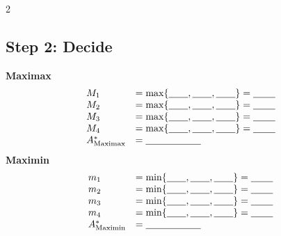\begin{multicols}{2}
		\subsection*{Step 2: Decide}
		\textbf{Maximax}
		\[
		\begin{array}{ll}
			M_1 &= \max\{\underline{\hspace{0.7cm}},\underline{\hspace{0.7cm}},\underline{\hspace{0.7cm}}\}
			=\underline{\hspace{0.8cm}} \\
			M_2 &= \max\{\underline{\hspace{0.7cm}},\underline{\hspace{0.7cm}},\underline{\hspace{0.7cm}}\}
			=\underline{\hspace{0.8cm}} \\
			M_3 &= \max\{\underline{\hspace{0.7cm}},\underline{\hspace{0.7cm}},\underline{\hspace{0.7cm}}\}
			=\underline{\hspace{0.8cm}} \\
			M_4 &= \max\{\underline{\hspace{0.7cm}},\underline{\hspace{0.7cm}},\underline{\hspace{0.7cm}}\}
			=\underline{\hspace{0.8cm}} \\
			A^*_{\mathrm{Maximax}} &= \underline{\hspace{2cm}}
		\end{array}
		\]
		\textbf{Maximin}
		\[
		\begin{array}{ll}
			m_1 &= \min\{\underline{\hspace{0.7cm}},\underline{\hspace{0.7cm}},\underline{\hspace{0.7cm}}\}
			=\underline{\hspace{0.8cm}} \\
			m_2 &= \min\{\underline{\hspace{0.7cm}},\underline{\hspace{0.7cm}},\underline{\hspace{0.7cm}}\}
			=\underline{\hspace{0.8cm}} \\
			m_3 &= \min\{\underline{\hspace{0.7cm}},\underline{\hspace{0.7cm}},\underline{\hspace{0.7cm}}\}
			=\underline{\hspace{0.8cm}} \\
			m_4 &= \min\{\underline{\hspace{0.7cm}},\underline{\hspace{0.7cm}},\underline{\hspace{0.7cm}}\}
			=\underline{\hspace{0.8cm}} \\
			A^*_{\mathrm{Maximin}} &= \underline{\hspace{2cm}}
		\end{array}
		\]

\end{multicols}

